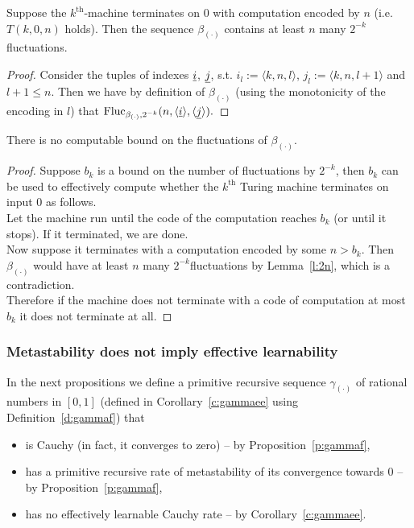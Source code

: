 \begin{lemma}\label{l:2n}
Suppose the $k^\text{th}$-machine terminates on $0$ with computation encoded by $n$ (i.e. $T(k,0,n)$ holds). Then the sequence $\beta_{(\cdot)}$ contains at 
least $n$ many $2^{-k}$\nbd fluctuations.
\end{lemma}
\begin{proof}
Consider the tuples of indexes $\underline i$, $\underline j$, 
s.t. $i_l:=\langle k,n,l\rangle$, $j_l:=\langle k,n,l+1\rangle$ and $l+1\leq n$. Then we have by definition of $\beta_{(\cdot)}$ (using the monotonicity of the encoding in $l$) that
$
\operatorname{Fluc}_{\beta_{(\cdot)},2^{-k}}(n,\langle \underline i \rangle, \langle \underline j\rangle).
$
\end{proof}

\begin{prop}\label{p:alphaHasNoFlucBd}
There is no computable bound on the fluctuations of $\beta_{(\cdot)}$.
\end{prop}
\begin{proof}
Suppose $b_k$ is a bound on the number of fluctuations by $2^{-k}$, 
then $b_k$ can be used to effectively compute whether the $k^{\text{th}}$ Turing machine terminates on input $0$ as follows.\\
Let the machine run until the code of the computation reaches $b_k$ (or until it stops). If it terminated, we are done.\\
Now suppose it terminates with a computation encoded by some $n>b_k$. Then $\beta_{(\cdot)}$ would have at least $n$ many $2^{-k}$\nbd fluctuations by Lemma~\ref{l:2n}, which is a contradiction.\\
Therefore if the machine does not terminate with a code of computation at most $b_k$ it does not terminate at all.
\end{proof}


\subsubsection*{Metastability does not imply effective learnability} \label{section4.2}

In the next propositions we define a primitive recursive sequence 
$\gamma_{(\cdot)}$ of rational numbers in $[0,1]$ 
(defined in Corollary~\ref{c:gammaee} using Definition~\ref{d:gammaf}) that
\begin{itemize}
\item is Cauchy (in fact, it converges to zero) -- by 
Proposition~\ref{p:gammaf},
\item has a primitive recursive rate of metastability of its 
convergence towards $0$ -- by Proposition~\ref{p:gammaf},
\item has no effectively learnable Cauchy rate -- by Corollary~\ref{c:gammaee}.
\end{itemize}

